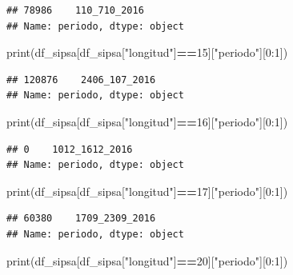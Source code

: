 \documentclass[
]{book}
\newenvironment{Shaded}{\begin{snugshade}}{\end{snugshade}}
\newcommand{\BuiltInTok}[1]{#1}
\newcommand{\DecValTok}[1]{\textcolor[rgb]{0.00,0.00,0.81}{#1}}
\newcommand{\NormalTok}[1]{#1}
\newcommand{\OperatorTok}[1]{\textcolor[rgb]{0.81,0.36,0.00}{\textbf{#1}}}
\newcommand{\StringTok}[1]{\textcolor[rgb]{0.31,0.60,0.02}{#1}}
\begin{document}
\begin{verbatim}
## 78986    110_710_2016
## Name: periodo, dtype: object
\end{verbatim}

\begin{Shaded}
\begin{Highlighting}[]
\BuiltInTok{print}\NormalTok{(df\_sipsa[df\_sipsa[}\StringTok{"longitud"}\NormalTok{]}\OperatorTok{==}\DecValTok{15}\NormalTok{][}\StringTok{"periodo"}\NormalTok{][}\DecValTok{0}\NormalTok{:}\DecValTok{1}\NormalTok{])}
\end{Highlighting}
\end{Shaded}

\begin{verbatim}
## 120876    2406_107_2016
## Name: periodo, dtype: object
\end{verbatim}

\begin{Shaded}
\begin{Highlighting}[]
\BuiltInTok{print}\NormalTok{(df\_sipsa[df\_sipsa[}\StringTok{"longitud"}\NormalTok{]}\OperatorTok{==}\DecValTok{16}\NormalTok{][}\StringTok{"periodo"}\NormalTok{][}\DecValTok{0}\NormalTok{:}\DecValTok{1}\NormalTok{])}
\end{Highlighting}
\end{Shaded}

\begin{verbatim}
## 0    1012_1612_2016
## Name: periodo, dtype: object
\end{verbatim}

\begin{Shaded}
\begin{Highlighting}[]
\BuiltInTok{print}\NormalTok{(df\_sipsa[df\_sipsa[}\StringTok{"longitud"}\NormalTok{]}\OperatorTok{==}\DecValTok{17}\NormalTok{][}\StringTok{"periodo"}\NormalTok{][}\DecValTok{0}\NormalTok{:}\DecValTok{1}\NormalTok{])}
\end{Highlighting}
\end{Shaded}

\begin{verbatim}
## 60380    1709_2309_2016
## Name: periodo, dtype: object
\end{verbatim}

\begin{Shaded}
\begin{Highlighting}[]
\BuiltInTok{print}\NormalTok{(df\_sipsa[df\_sipsa[}\StringTok{"longitud"}\NormalTok{]}\OperatorTok{==}\DecValTok{20}\NormalTok{][}\StringTok{"periodo"}\NormalTok{][}\DecValTok{0}\NormalTok{:}\DecValTok{1}\NormalTok{])}
\end{Highlighting}
\end{Shaded}
\end{document}

